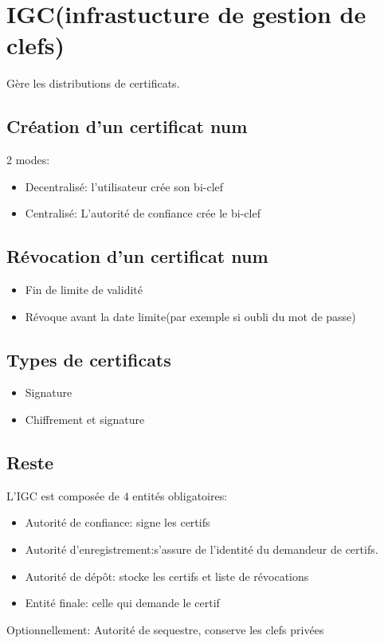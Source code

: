 \documentclass[12pt]{article}
\theoremstyle{plain}
\theoremstyle{definition}
\begin{document}
\newpage
\section{IGC(infrastucture de gestion de clefs)}

Gère les distributions de certificats.

\subsection{Création d'un certificat num}
2 modes:
\begin{itemize}
    \item Decentralisé: l'utilisateur crée son bi-clef
    \item Centralisé: L'autorité de confiance crée le bi-clef
\end{itemize}

\subsection{Révocation d'un certificat num}
\begin{itemize}
    \item Fin de limite de validité
    \item Révoque avant la date limite(par exemple 
    si oubli du mot de passe)
\end{itemize}

\subsection{Types de certificats}
\begin{itemize}
    \item Signature
    \item Chiffrement et signature
\end{itemize}
\subsection{Reste}
L'IGC est composée de $4$ entités obligatoires:
\begin{itemize}
    \item Autorité de confiance: signe les certifs
    \item Autorité d'enregistrement:s'assure de l'identité
    du demandeur de certifs.
    \item Autorité de dépôt: stocke les certifs et liste
    de révocations
    \item Entité finale: celle qui demande le certif
\end{itemize}
Optionnellement: Autorité de sequestre, conserve les clefs privées
\end{document}
